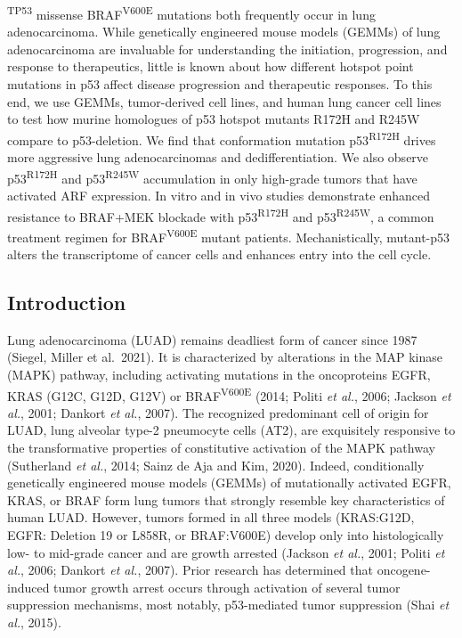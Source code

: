 \textsuperscript{TP53} missense BRAF\textsuperscript{V600E} mutations both frequently occur in lung adenocarcinoma. While genetically engineered mouse models (GEMMs) of lung adenocarcinoma are invaluable for understanding the initiation, progression, and response to therapeutics, little is known about how different hotspot point mutations in p53 affect disease progression and therapeutic responses. To this end, we use GEMMs, tumor-derived cell lines, and human lung cancer cell lines to test how murine homologues of p53 hotspot mutants R172H and R245W compare to p53-deletion. We find that conformation mutation p53\textsuperscript{R172H} drives more aggressive lung adenocarcinomas and dedifferentiation. We also observe p53\textsuperscript{R172H} and p53\textsuperscript{R245W} accumulation in only high-grade tumors that have activated ARF expression. In vitro and in vivo studies demonstrate enhanced resistance to BRAF+MEK blockade with p53\textsuperscript{R172H} and p53\textsuperscript{R245W}, a common treatment regimen for BRAF\textsuperscript{V600E} mutant patients. Mechanistically, mutant-p53 alters the transcriptome of cancer cells and enhances entry into the cell cycle.

\hypertarget{introduction-1}{%
\subsection{Introduction}\label{introduction-1}}

Lung adenocarcinoma (LUAD) remains deadliest form of cancer since 1987 (Siegel, Miller et al.~2021). It is characterized by alterations in the MAP kinase (MAPK) pathway, including activating mutations in the oncoproteins EGFR, KRAS (G12C, G12D, G12V) or BRAF\textsuperscript{V600E} (2014; Politi \emph{et al.}, 2006; Jackson \emph{et al.}, 2001; Dankort \emph{et al.}, 2007). The recognized predominant cell of origin for LUAD, lung alveolar type-2 pneumocyte cells (AT2), are exquisitely responsive to the transformative properties of constitutive activation of the MAPK pathway (Sutherland \emph{et al.}, 2014; Sainz de Aja and Kim, 2020). Indeed, conditionally genetically engineered mouse models (GEMMs) of mutationally activated EGFR, KRAS, or BRAF form lung tumors that strongly resemble key characteristics of human LUAD. However, tumors formed in all three models (KRAS:G12D, EGFR: Deletion 19 or L858R, or BRAF:V600E) develop only into histologically low- to mid-grade cancer and are growth arrested (Jackson \emph{et al.}, 2001; Politi \emph{et al.}, 2006; Dankort \emph{et al.}, 2007). Prior research has determined that oncogene-induced tumor growth arrest occurs through activation of several tumor suppression mechanisms, most notably, p53-mediated tumor suppression (Shai \emph{et al.}, 2015).

